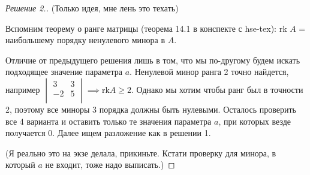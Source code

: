 \documentclass[a4paper]{article}
\theoremstyle{remark}
\begin{document}
        \begin{proof}[Решение 2.] (Только идея, мне лень это техать)\

            Вспомним теорему о ранге матрицы (теорема 14.1 в конспекте с hse-tex): 
            rk $A$ = наибольшему порядку ненулевого минора в $A$. 
            
            Отличие от предыдущего решения лишь в том, что мы по-другому будем искать подходящее 
            значение параметра $a$. Ненулевой минор ранга 2 точно найдется, 
            например
            $
            \begin{vmatrix}
                3 & 3 \\ 
                -2 & 5 \\ 
            \end{vmatrix}
            \implies \text{rk} A \geqslant 2$. Однако мы хотим чтобы ранг был в точности 2, поэтому 
            все миноры 3 порядка должны быть нулевыми. Осталось проверить все 4 варианта и оставить только те 
            значения параметра $a$, при которых везде получается 0. Далее ищем разложение как в решении 1.
            
            (Я реально это на экзе делала, прикиньте. 
            Кстати  проверку для минора, в который $a$ не входит, тоже надо выписать.)
        \end{proof}
\end{document}
